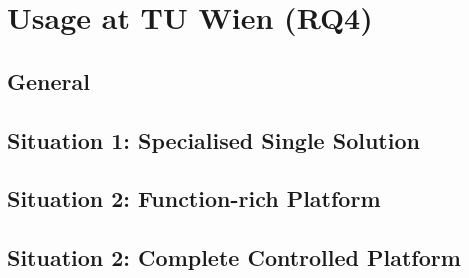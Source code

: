 \chapter{Usage at TU Wien (RQ4)}

\section{General}
\section{Situation 1: Specialised Single Solution}
\section{Situation 2: Function-rich Platform}
\section{Situation 2: Complete Controlled Platform}